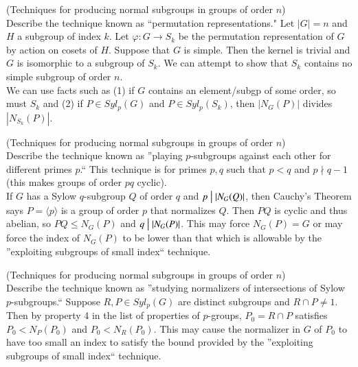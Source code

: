 \documentclass[avery5371,grid]{flashcards}
\newcommand{\divides}{\bigm|}
\let \phi \varphi
\begin{document}
\begin{flashcard}[Groups]{(Techniques for producing normal subgroups in groups of order $n$) \\ \vspace{5pt} Describe the technique known as ``permutation representations."}
 Let $|G| = n$ and $H$ a subgroup of index $k$. Let $\phi: G \to S_k$ be the permutation representation of $G$ by action on cosets of $H$. Suppose that $G$ is simple. Then the kernel is trivial and $G$ is isomorphic to a subgroup of $S_k$. We can attempt to show that $S_k$ contains no simple subgroup of order $n$.\\
 
 We can use facts such as (1) if $G$ contains an element/subgp of some order, so must $S_k$ and (2) if $P \in Syl_p(G)$ and $P \in Syl_p(S_k)$, then $|N_G(P)|$ divides $|N_{S_k}(P)|$.
\end{flashcard}

\begin{flashcard}[Groups]{(Techniques for producing normal subgroups in groups of order $n$) \\ \vspace{5pt} Describe the technique known as ''playing $p$-subgroups against each other for different primes $p$.``}
 This technique is for primes $p,q$ such that $p<q$ and $p \nmid q-1$ (this makes groups of order $pq$ cyclic).\\
 
 If $G$ has a Sylow $q$-subgroup $Q$ of order $q$ and $p \divides | N_G(Q) |$, then Cauchy's Theorem says $P = \langle p \rangle$ is a group of order $p$ that normalizes $Q$. Then $PQ$ is cyclic and thus abelian, so $PQ \leq N_G(P)$ and $q \divides |N_G(P)|$. This may force $N_G(P) = G$ or may force the index of $N_G(P)$ to be lower than that which is allowable by the ''exploiting subgroups of small index`` technique.
\end{flashcard}

\begin{flashcard}[Groups]{(Techniques for producing normal subgroups in groups of order $n$) \\ \vspace{5pt} Describe the technique known as ''studying normalizers of intersections of Sylow $p$-subgroups.``}
 Suppose $R,P \in Syl_p(G)$ are distinct subgroups and $R \cap P \neq 1$. Then by property 4 in the list of properties of $p$-groups, $P_0 = R \cap P$ satisfies $P_0 < N_P(P_0)$ and $P_0 < N_R(P_0)$. This may cause the normalizer in $G$ of $P_0$ to have too small an index to satisfy the bound provided by the ''exploiting subgroups of small index`` technique.
\end{flashcard}
\end{document}
